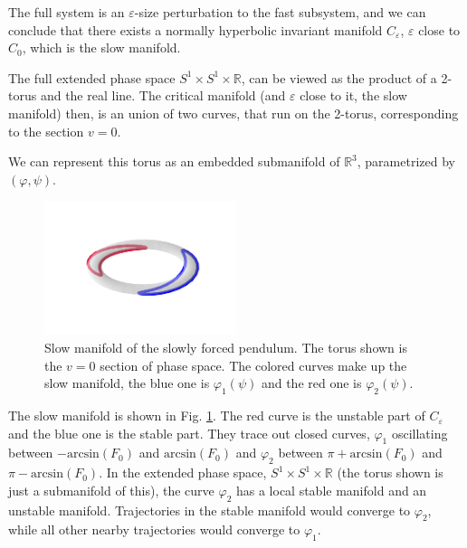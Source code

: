 \begin{solution}[9.6]
The full system is an $\varepsilon$-size perturbation to the fast subsystem, and we can conclude that there exists a normally hyperbolic invariant manifold $C_\varepsilon$, $\varepsilon$ close to $C_0$, which is the slow manifold. 

The full extended phase space $S^1 \times S^1 \times \mathbb{R}$, can be viewed as the product of a 2-torus and the real line. The critical manifold (and $\varepsilon$ close to it, the slow manifold) then, is an union of two curves, that run on the 2-torus, corresponding to the section $v=0$. 

We can represent this torus as an embedded submanifold of $\mathbb{R}^3$, parametrized by $(\varphi, \psi)$. 

\begin{figure}[h]
    \centering
    \includegraphics[width = 0.5\textwidth]{figures/solutions/ch9/torus.png}
    \caption{Slow manifold of the slowly forced pendulum. The torus shown is the $v=0$ section of phase space. The colored curves make up the slow manifold, the blue one is $\varphi_1(\psi)$ and the red one is $\varphi_2(\psi)$. }
    \label{fig:t}
\end{figure}
The slow manifold is shown in Fig. \ref{fig:t}. The red curve is the unstable part of $C_\varepsilon$ and the blue one is the stable part. 
They trace out closed curves, $\varphi_1$ oscillating between $-\text{arcsin}(F_0)$ and $\text{arcsin}(F_0)$ and $\varphi_2$ between $\pi + \text{arcsin}(F_0)$ and $\pi-\text{arcsin}(F_0)$. 
In the extended phase space, $S^1 \times S^1 \times \mathbb{R}$ (the torus shown is just a submanifold of this), 
the curve $\varphi_2$ has a local stable manifold and an unstable manifold. Trajectories in the stable manifold would converge to $\varphi_2$, while all other nearby trajectories would converge to $\varphi_1$. 
\end{solution}

